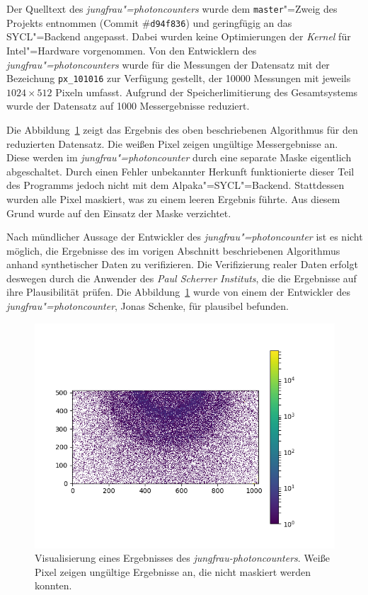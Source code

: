 Der Quelltext des \textit{jungfrau"=photoncounters} wurde dem
\texttt{master}"=Zweig des Projekts entnommen (Commit \#\texttt{d94f836}) und
geringfügig an das SYCL"=Backend angepasst. Dabei wurden keine Optimierungen der
\textit{Kernel} für Intel"=Hardware vorgenommen. Von den Entwicklern des
\textit{jungfrau"=photoncounters} wurde für die Messungen der Datensatz mit der
Bezeichung \texttt{px\_101016} zur Verfügung gestellt, der \num{10000}
Messungen mit jeweils $1024 \times 512$ Pixeln umfasst. Aufgrund der
Speicherlimitierung des Gesamtsystems wurde der Datensatz auf \num{1000}
Messergebnisse reduziert.

Die Abbildung~\ref{ergebnisse:verifizierung:performanz:photonen} zeigt das
Ergebnis des oben beschriebenen Algorithmus für den reduzierten Datensatz. Die
weißen Pixel zeigen ungültige Messergebnisse an. Diese werden im
\textit{jungfrau"=photoncounter} durch eine separate Maske eigentlich
abgeschaltet. Durch einen Fehler unbekannter Herkunft funktionierte dieser Teil
des Programms jedoch nicht mit dem Alpaka"=SYCL"=Backend. Stattdessen wurden
alle Pixel maskiert, was zu einem leeren Ergebnis führte. Aus diesem Grund wurde
auf den Einsatz der Maske verzichtet.

Nach mündlicher Aussage der Entwickler des \textit{jungfrau"=photoncounter} ist
es nicht möglich, die Ergebnisse des im vorigen Abschnitt beschriebenen
Algorithmus anhand synthetischer Daten zu verifizieren. Die Verifizierung realer
Daten erfolgt deswegen durch die Anwender des \textit{Paul Scherrer Instituts},
die die Ergebnisse auf ihre Plausibilität prüfen. Die
Abbildung~\ref{ergebnisse:verifizierung:performanz:photonen} wurde von einem der
Entwickler des \textit{jungfrau"=photoncounter}, Jonas Schenke, für plausibel
befunden.

\begin{figure}
    \centering
    \includegraphics{log/photon.png}
    \caption[Visualisierung eines Ergebnisses des
             \textit{jungfrau-photoncounters}]{Visualisierung eines Ergebnisses
             des \textit{jungfrau-photoncounters}. Weiße Pixel zeigen
             ungültige Ergebnisse an, die nicht maskiert werden konnten.}
    \label{ergebnisse:verifizierung:performanz:photonen}
\end{figure}


